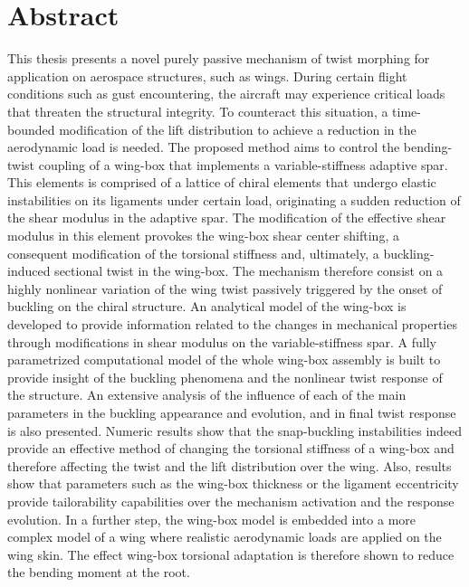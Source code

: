 \section*{Abstract}

This thesis presents a novel purely passive mechanism of twist morphing for application on aerospace structures, such as wings. During certain flight conditions such as gust encountering, the aircraft may experience critical loads that threaten the structural integrity. To counteract this situation, a time-bounded modification of the lift distribution to achieve a reduction in the aerodynamic load is needed. The proposed method aims to control the bending-twist coupling of a wing-box that implements a variable-stiffness adaptive spar. This elements is comprised of a lattice of chiral elements that undergo elastic instabilities on its ligaments under certain load, originating a sudden reduction of the shear modulus in the adaptive spar. The modification of the effective shear modulus in this element provokes the wing-box shear center shifting, a consequent modification of the torsional stiffness and, ultimately, a buckling-induced sectional twist in the wing-box. The mechanism therefore consist on a highly nonlinear variation of the wing twist passively triggered by the onset of buckling on the chiral structure. An analytical model of the wing-box is developed to provide information related to the changes in mechanical properties through modifications in shear modulus on the variable-stiffness spar. A fully parametrized computational model of the whole wing-box assembly is built to provide insight of the buckling phenomena and the nonlinear twist response of the structure. An extensive analysis of the influence of each of the main parameters in the buckling appearance and evolution, and in final twist response is also presented. Numeric results show that the snap-buckling instabilities indeed provide an effective method of changing the torsional stiffness of a wing-box and therefore affecting the twist and the lift distribution over the wing. Also, results show that parameters such as the wing-box thickness or the ligament eccentricity provide tailorability capabilities over the mechanism activation and the response evolution. In a further step, the wing-box model is embedded into a more complex model of a wing where realistic aerodynamic loads are applied on the wing skin. The effect wing-box torsional adaptation is therefore shown to reduce the bending moment at the root.
%
%
